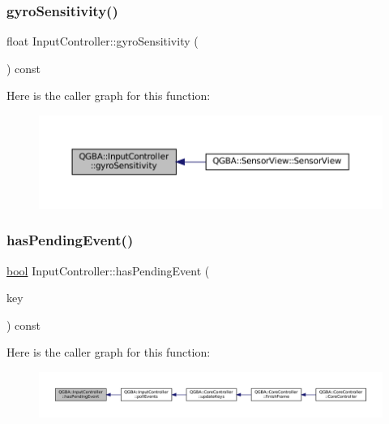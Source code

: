 \subsubsection{\texorpdfstring{gyro\+Sensitivity()}{gyroSensitivity()}}
{\footnotesize\ttfamily float Input\+Controller\+::gyro\+Sensitivity (\begin{DoxyParamCaption}{ }\end{DoxyParamCaption}) const}

Here is the caller graph for this function\+:
\nopagebreak
\begin{figure}[H]
\begin{center}
\leavevmode
\includegraphics[width=350pt]{class_q_g_b_a_1_1_input_controller_af61ebb5bca73dca53b40eadf12947ade_icgraph}
\end{center}
\end{figure}
\mbox{\label{class_q_g_b_a_1_1_input_controller_ac7349ad1b448e3fe77ee981862c7d5d2}} 
\subsubsection{\texorpdfstring{has\+Pending\+Event()}{hasPendingEvent()}}
{\footnotesize\ttfamily \mbox{\hyperlink{libretro_8h_a4a26dcae73fb7e1528214a068aca317e}{bool}} Input\+Controller\+::has\+Pending\+Event (\begin{DoxyParamCaption}\item[{G\+B\+A\+Key}]{key }\end{DoxyParamCaption}) const\hspace{0.3cm}{\ttfamily [private]}}

Here is the caller graph for this function\+:
\nopagebreak
\begin{figure}[H]
\begin{center}
\leavevmode
\includegraphics[width=350pt]{class_q_g_b_a_1_1_input_controller_ac7349ad1b448e3fe77ee981862c7d5d2_icgraph}
\end{center}
\end{figure}
\mbox{\label{class_q_g_b_a_1_1_input_controller_a6147d43ba78ebdce790666ab74922ba3}} 
